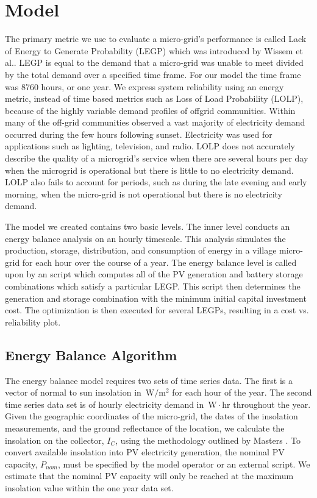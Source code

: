 \documentclass{article}
\newcommand{\unit}[1]{\ensuremath{\, \mathrm{#1}}}
\begin{document}
\section{Model}
The primary metric we use to evaluate a micro-grid's performance is called Lack of Energy to Generate Probability (LEGP) which was introduced by Wissem et al.\cite{}.
LEGP is equal to the demand that a micro-grid was unable to meet divided by the total demand over a specified time frame. 
For our model the time frame was 8760 hours, or one year. 
We express system reliability using an energy metric, instead of time based metrics such as Loss of Load Probability (LOLP), because of the highly variable demand profiles of offgrid communities. 
Within many of the off-grid communities observed a vast majority of electricity demand occurred during the few hours following sunset.
Electricity was used for applications such as lighting, television, and radio. 
LOLP does not accurately describe the quality of a microgrid's service when there are several hours per day when the microgrid is operational but there is little to no electricity demand. 
LOLP also fails to account for periods, such as during the late evening and early morning, when the micro-grid is not operational but there is no electricity demand.

The model we created contains two basic levels.
The inner level conducts an energy balance analysis on an hourly timescale.
This analysis simulates the production, storage, distribution, and consumption of energy in a village micro-grid for each hour over the course of a year. 
The energy balance level is called upon by an script which computes all of the PV generation and battery storage combinations which satisfy a particular LEGP. 
This script then determines the generation and storage combination with the minimum initial capital investment cost. 
The optimization is then executed for several LEGPs, resulting in a cost vs. reliability plot.

\subsection{Energy Balance Algorithm}

The energy balance model requires two sets of time series data. 
The first is a vector of normal to sun insolation in \unit{W/m^2} for each hour of the year.
The second time series data set is of hourly electricity demand in \unit{W\cdot hr} throughout the year. 
Given the geographic coordinates of the micro-grid, the dates of the insolation measurements, and the ground reflectance of the location, we calculate the insolation on the collector, $I_C$, using the methodology outlined by Masters \cite{}. 
To convert available insolation into PV electricity generation, the nominal PV capacity, $P_{nom}$, must be specified by the model operator or an external script.
We estimate that the nominal PV capacity will only be reached at the maximum insolation value within the one year data set.
\end{document}
